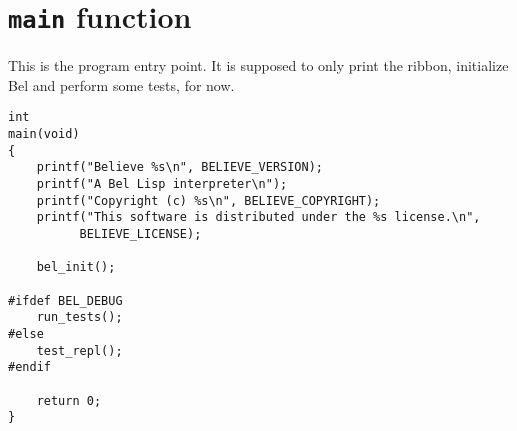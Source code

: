 \documentclass[openright,a4paper,twoside,12pt]{memoir}
\begin{document}
\section{\texttt{main} function}
\label{sec:orga6fb6c6}

This is the program entry point. It is supposed to only print the
ribbon, initialize Bel and perform some tests, for now.

\begin{verbatim}
int
main(void)
{
    printf("Believe %s\n", BELIEVE_VERSION);
    printf("A Bel Lisp interpreter\n");
    printf("Copyright (c) %s\n", BELIEVE_COPYRIGHT);
    printf("This software is distributed under the %s license.\n",
          BELIEVE_LICENSE);

    bel_init();

#ifdef BEL_DEBUG
    run_tests();
#else
    test_repl();
#endif
    
    return 0;
}
\end{verbatim}
\end{document}
